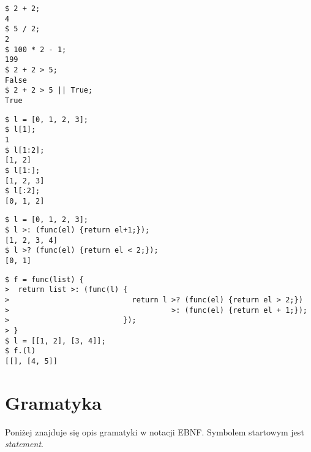 \documentclass{article}
\begin{document}
\begin{lstlisting}[frame=tb, title={Operacje na typach prostych}]
$ 2 + 2;
4
$ 5 / 2;
2
$ 100 * 2 - 1;
199
$ 2 + 2 > 5;
False
$ 2 + 2 > 5 || True;
True
\end{lstlisting}
\begin{lstlisting}[frame=tb, title={Pobieranie elementów listy}]
$ l = [0, 1, 2, 3];
$ l[1];
1
$ l[1:2];
[1, 2]
$ l[1:];
[1, 2, 3]
$ l[:2];
[0, 1, 2]
\end{lstlisting}
\begin{lstlisting}[frame=tb, title={Operacje \textit{map} i \textit{filter}}]
$ l = [0, 1, 2, 3];
$ l >: (func(el) {return el+1;});
[1, 2, 3, 4]
$ l >? (func(el) {return el < 2;});
[0, 1]
\end{lstlisting}
\begin{lstlisting}[frame=tb, title={Obiekty funkcyjne}]
$ f = func(list) {
>  return list >: (func(l) {
>                            return l >? (func(el) {return el > 2;})
>                                     >: (func(el) {return el + 1;});
>                          });
> }
$ l = [[1, 2], [3, 4]];
$ f.(l)
[[], [4, 5]]
\end{lstlisting}

\section{Gramatyka}
	Poniżej znajduje się opis gramatyki w notacji EBNF. Symbolem startowym jest \textit{statement}.

	\renewcommand{\syntleft}{\normalfont\itshape}
	\renewcommand{\syntright}{}
\end{document}
